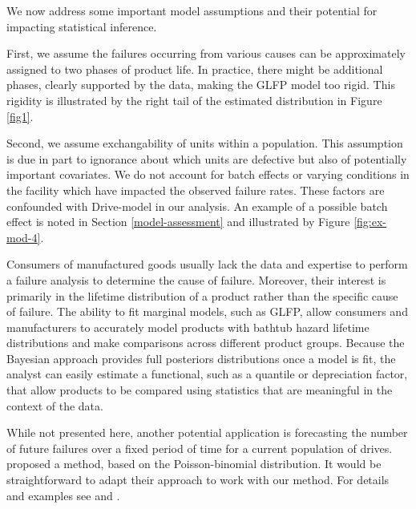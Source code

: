 \documentclass[aap]{imsart}
\begin{document}
We now address some important model assumptions and their potential for impacting statistical inference. 

First, we assume the failures occurring from various causes can be approximately assigned to two phases of product life.  In practice, there might be additional phases, clearly supported by the data, making the GLFP model too rigid. This rigidity is illustrated by the right tail of the estimated distribution in Figure \ref{fig1}.

Second, we assume exchangability of units within a population. This assumption is due in part to ignorance about which units are defective but also of potentially important covariates. We do not account for batch effects or varying conditions in the facility which have impacted the observed failure rates. These factors are confounded with Drive-model in our analysis. An example of a possible batch effect is noted in Section \ref{model-assessment} and illustrated by Figure \ref{fig:ex-mod-4}. 

Consumers of manufactured goods usually lack the data and expertise to perform a failure analysis to determine the cause of failure.  Moreover, their interest is primarily in the lifetime distribution of a product rather than the specific cause of failure.  The ability to fit marginal models, such as GLFP, allow consumers and manufacturers to accurately model products with bathtub hazard lifetime distributions and make comparisons across different product groups.  Because the Bayesian approach provides full posteriors distributions once a model is fit, the analyst can easily estimate a functional, such as a quantile or depreciation factor, that allow products to be compared using statistics that are meaningful in the context of the data. 

While not presented here, another potential application is forecasting the number of future failures over a fixed period of time for a current population of drives. \citet{hmm} proposed a method, based on the Poisson-binomial distribution. It would be straightforward to adapt their approach to work with our method. For details and examples see \citet[Sect.~6]{hmm} and \citet{xu2015assessing}.

\end{document}
